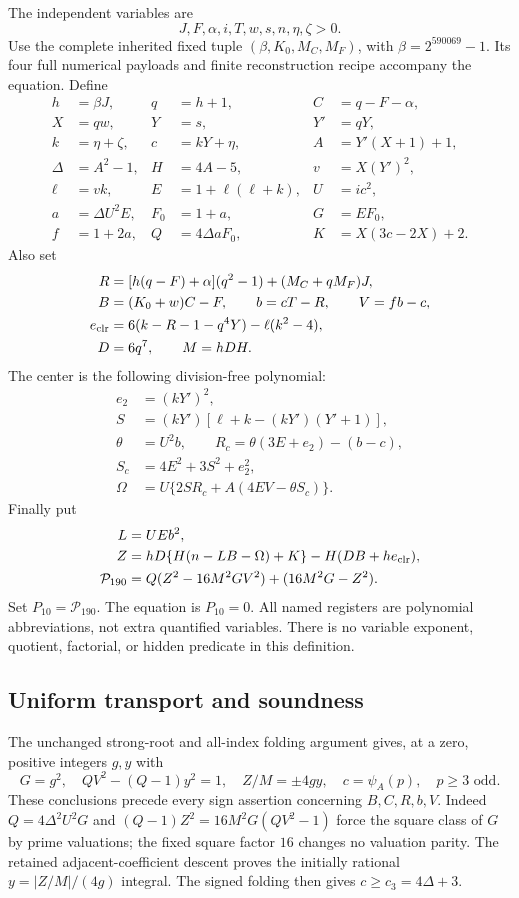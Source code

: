 The independent variables are
\[
 J,F,\alpha,i,T,w,s,n,\eta,\zeta>0.
\]
Use the complete inherited fixed tuple $(\beta,K_0,M_C,M_F)$, with
$\beta=2^{590069}-1$.  Its four full numerical payloads and finite
reconstruction recipe accompany the equation.  Define
\begin{align*}
 h&=\beta J,&q&=h+1,&C&=q-F-\alpha,\\
 X&=qw,&Y&=s,&Y'&=qY,\\
 k&=\eta+\zeta,&c&=kY+\eta,&A&=Y'(X+1)+1,\\
 \Delta&=A^2-1,&H&=4A-5,&v&=X(Y')^2,\\
 \ell&=vk,&E&=1+\ell(\ell+k),&U&=ic^2,\\
 a&=\Delta U^2E,&F_0&=1+a,&G&=EF_0,\\
 f&=1+2a,&Q&=4\Delta aF_0,&K&=X(3c-2X)+2.
\end{align*}
Also set
\begin{align*}
 R&=[h(q-F)+\alpha](q^2-1)+(M_C+qM_F)J,\\
 B&=(K_0+w)C-F,\qquad b=cT-R,\qquad V=fb-c,\\
 e_{\rm clr}&=6(k-R-1-q^4Y)-\ell(k^2-4),\\
 D&=6q^7,\qquad M=hDH.
\end{align*}
The center is the following division-free polynomial:
\begin{align*}
 e_2&=(kY')^2,\\
 S&=(kY')[\ell+k-(kY')(Y'+1)],\\
 \theta&=U^2b,\qquad R_c=\theta(3E+e_2)-(b-c),\\
 S_c&=4E^2+3S^2+e_2^2,\\
 \Omega&=U\{2SR_c+A(4EV-\theta S_c)\}.
\end{align*}
Finally put
\begin{align*}
 L&=UEb^2,\\
 Z&=hD\{H(n-LB-\Omega)+K\}-H(DB+h e_{\rm clr}),\\
 \mathcal P_{190}&=Q(Z^2-16M^2GV^2)+(16M^2G-Z^2).
\end{align*}
Set $P_{10}=\mathcal P_{190}$. The equation is $P_{10}=0$.  All named registers are
polynomial abbreviations, not extra quantified variables.  There is no
variable exponent, quotient, factorial, or hidden predicate in this
definition.

\subsection{Uniform transport and soundness}

The unchanged strong-root and all-index folding argument gives, at a zero,
positive integers $g,y$ with
\[
 G=g^2,\quad QV^2-(Q-1)y^2=1,\quad Z/M=\pm4gy,
 \quad c=\psi_A(p),\quad p\ge3\text{ odd}.
\]
These conclusions precede every sign assertion concerning $B,C,R,b,V$.
Indeed $Q=4\Delta^2U^2G$ and
$(Q-1)Z^2=16M^2G(QV^2-1)$ force the square class of $G$ by prime
valuations; the fixed square factor $16$ changes no valuation parity.
The retained adjacent-coefficient descent proves the initially rational
$y=|Z/M|/(4g)$ integral.  The signed folding then gives
$c\ge c_3=4\Delta+3$.

